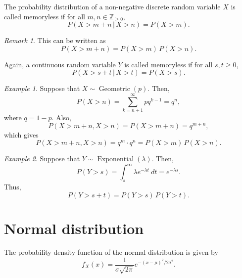 \documentclass[11pt]{article}
\def\Z{\mathbb{Z}}
\theoremstyle{definition}
\theoremstyle{remark}
\newtheorem*{remark}{Remark}
\newtheorem*{example}{Example}
\numberwithin{equation}{module}
\begin{document}
    \begin{definition}[Memorylessness]
        The probability distribution of a non-negative discrete random variable $X$
        is called memoryless if for all $m, n \in \Z_{\geq 0}$, \[
            P(X > m + n\,|\, X > n) = P(X > m).
        \] 
        \begin{remark}
            This can be written as \[
                P(X > m + n) = P(X > m) \, P(X > n).
            \] 
        \end{remark}
        \noindent Again, a continuous random variable $Y$ is called memoryless if
        for all $s, t \geq 0$, \[
            P(X > s + t\,|\, X > t) = P(X > s).
        \] 
    \end{definition}
    \begin{example}
        Suppose that $X\sim\operatorname{Geometric}(p)$. Then, \[
            P(X > n) = \sum_{k = n + 1}^\infty pq^{k - 1} = q^n,
        \] where $q = 1 - p$. Also, \[
            P(X > m + n, X > n) = P(X > m + n) = q^{m + n},
        \] which gives \[
            P(X > m + n, X > n) = q^m\cdot q^n = P(X > m)\, P(X > n).
        \] 
    \end{example}
    \begin{example}
        Suppose that $Y\sim\operatorname{Exponential}(\lambda)$. Then, \[
            P(Y > s) = \int_s^\infty \lambda e^{-\lambda t}\:dt = e^{-\lambda s}.
        \] Thus, \[
            P(Y > s + t) = P(Y > s)\, P(Y > t).
        \] 
    \end{example}
    
    \section*{Normal distribution}
    The probability density function of the normal distribution is given by \[
        f_X(x) = \frac{1}{\sigma\sqrt{2\pi}}e^{-(x - \mu)^2/2\sigma^2}.
    \] 
\end{document}
